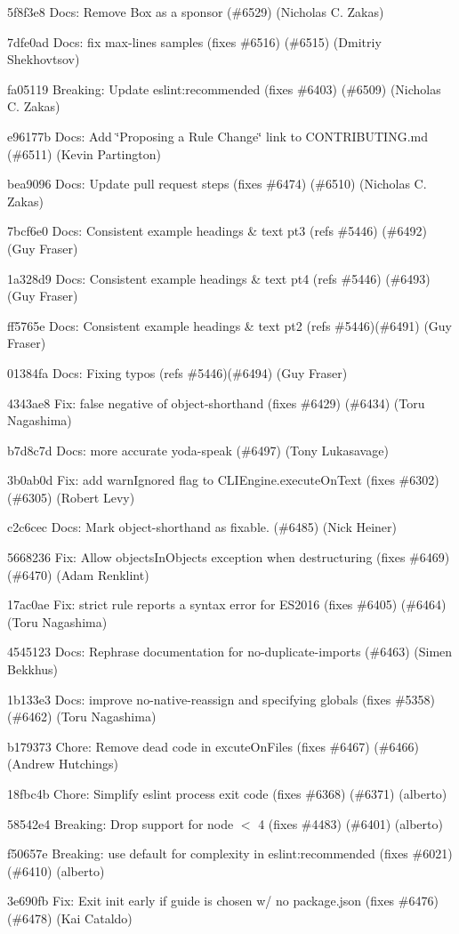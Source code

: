 \begin{DoxyItemize}
\item 5f8f3e8 Docs\+: Remove Box as a sponsor (\#6529) (Nicholas C. Zakas)
\item 7dfe0ad Docs\+: fix max-\/lines samples (fixes \#6516) (\#6515) (Dmitriy Shekhovtsov)
\item fa05119 Breaking\+: Update eslint\+:recommended (fixes \#6403) (\#6509) (Nicholas C. Zakas)
\item e96177b Docs\+: Add \char`\"{}\+Proposing a Rule Change\char`\"{} link to C\+O\+N\+T\+R\+I\+B\+U\+T\+I\+N\+G.\+md (\#6511) (Kevin Partington)
\item bea9096 Docs\+: Update pull request steps (fixes \#6474) (\#6510) (Nicholas C. Zakas)
\item 7bcf6e0 Docs\+: Consistent example headings \& text pt3 (refs \#5446) (\#6492) (Guy Fraser)
\item 1a328d9 Docs\+: Consistent example headings \& text pt4 (refs \#5446) (\#6493) (Guy Fraser)
\item ff5765e Docs\+: Consistent example headings \& text pt2 (refs \#5446)(\#6491) (Guy Fraser)
\item 01384fa Docs\+: Fixing typos (refs \#5446)(\#6494) (Guy Fraser)
\item 4343ae8 Fix\+: false negative of {\ttfamily object-\/shorthand} (fixes \#6429) (\#6434) (Toru Nagashima)
\item b7d8c7d Docs\+: more accurate yoda-\/speak (\#6497) (Tony Lukasavage)
\item 3b0ab0d Fix\+: add warn\+Ignored flag to C\+L\+I\+Engine.\+execute\+On\+Text (fixes \#6302) (\#6305) (Robert Levy)
\item c2c6cec Docs\+: Mark object-\/shorthand as fixable. (\#6485) (Nick Heiner)
\item 5668236 Fix\+: Allow objects\+In\+Objects exception when destructuring (fixes \#6469) (\#6470) (Adam Renklint)
\item 17ac0ae Fix\+: {\ttfamily strict} rule reports a syntax error for E\+S2016 (fixes \#6405) (\#6464) (Toru Nagashima)
\item 4545123 Docs\+: Rephrase documentation for {\ttfamily no-\/duplicate-\/imports} (\#6463) (Simen Bekkhus)
\item 1b133e3 Docs\+: improve {\ttfamily no-\/native-\/reassign} and specifying globals (fixes \#5358) (\#6462) (Toru Nagashima)
\item b179373 Chore\+: Remove dead code in excute\+On\+Files (fixes \#6467) (\#6466) (Andrew Hutchings)
\item 18fbc4b Chore\+: Simplify eslint process exit code (fixes \#6368) (\#6371) (alberto)
\item 58542e4 Breaking\+: Drop support for node $<$ 4 (fixes \#4483) (\#6401) (alberto)
\item f50657e Breaking\+: use default for complexity in eslint\+:recommended (fixes \#6021) (\#6410) (alberto)
\item 3e690fb Fix\+: Exit init early if guide is chosen w/ no package.\+json (fixes \#6476) (\#6478) (Kai Cataldo)
\end{DoxyItemize}

